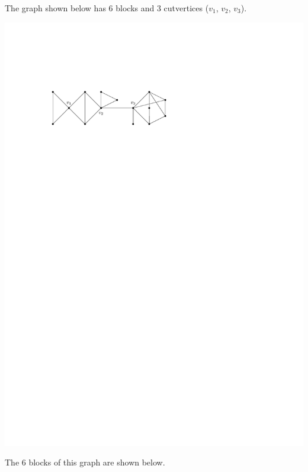 \begin{Example}\label{ex:Blocks}
The graph shown below has $6$ blocks and $3$ cutvertices ($v_1$, $v_2$, $v_3$).
\begin{center}
\includegraphics{6BlockGraph2.pdf}
\end{center}
The $6$ blocks of this graph are shown below.
\begin{center}

\end{center}
\end{Example}
